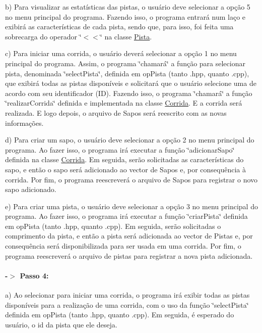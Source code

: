 b) Para visualizar as estatísticas das pistas, o usuário deve selecionar a opção 5 no menu principal do programa. Fazendo isso, o programa entrará num laço e exibirá as características de cada pista, sendo que, para isso, foi feita uma sobrecarga do operador \char`\"{}$<$$<$\char`\"{} na classe \hyperlink{classPista}{Pista}. 

c) Para iniciar uma corrida, o usuário deverá selecionar a opção 1 no menu principal do programa. Assim, o programa \char`\"{}chamará\char`\"{} a função para selecionar pista, denominada \char`\"{}select\+Pista\char`\"{}, definida em op\+Pista (tanto .hpp, quanto .cpp), que exibirá todas as pistas disponíveis e solicitará que o usuário selecione uma de acordo com seu identificador (ID). Fazendo isso, o programa \char`\"{}chamará\char`\"{} a função \char`\"{}realizar\+Corrida\char`\"{} definida e implementada na classe \hyperlink{classCorrida}{Corrida}. E a corrida será realizada. E logo depois, o arquivo de Sapos será reescrito com as novas informações. 

d) Para criar um sapo, o usuário deve selecionar a opção 2 no menu principal do programa. Ao fazer isso, o programa irá executar a função \char`\"{}adicionar\+Sapo\char`\"{} definida na classe \hyperlink{classCorrida}{Corrida}. Em seguida, serão solicitadas as características do sapo, e então o sapo será adicionado ao vector de Sapos e, por consequência à corrida. Por fim, o programa reescreverá o arquivo de Sapos para registrar o novo sapo adicionado. 

e) Para criar uma pista, o usuário deve selecionar a opção 3 no menu principal do programa. Ao fazer isso, o programa irá executar a função \char`\"{}criar\+Pista\char`\"{} definida em op\+Pista (tanto .hpp, quanto .cpp). Em seguida, serão solicitadas o comprimento da pista, e então a pista será adicionada ao vector de Pistas e, por consequência será disponibilizada para ser usada em uma corrida. Por fim, o programa reescreverá o arquivo de pistas para registrar a nova pista adicionada.

\paragraph*{-\/$>$ Passo 4\+:}

a) Ao selecionar para iniciar uma corrida, o programa irá exibir todas as pistas disponíveis para a realização de uma corrida, com o uso da função \char`\"{}select\+Pista\char`\"{} definida em op\+Pista (tanto .hpp, quanto .cpp). Em seguida, é esperado do usuário, o id da pista que ele deseja. 

